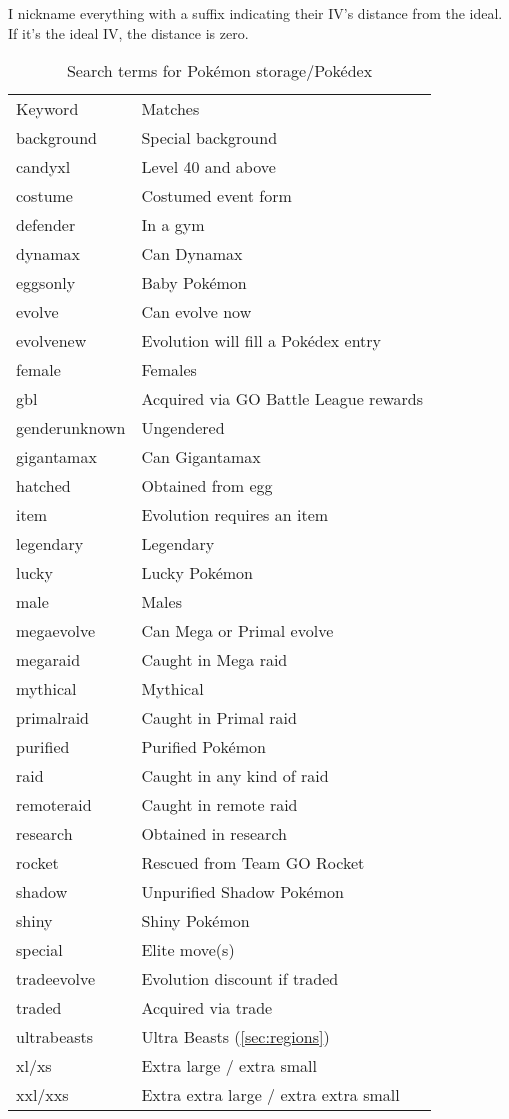 I nickname everything with a suffix indicating their IV's distance from the ideal.
If it's the ideal IV, the distance is zero.
\begin{table}
\centering\small
\begin{tabular}{ll}
Keyword & Matches \\
\Midrule
background & Special background \\
candyxl & Level 40 and above \\
costume & Costumed event form \\
defender & In a gym \\
dynamax & Can Dynamax\\
eggsonly & Baby Pokémon \\
evolve & Can evolve now\\
evolvenew & Evolution will fill a Pokédex entry\\
female & Females \\
gbl & Acquired via GO Battle League rewards\\
genderunknown & Ungendered \\
gigantamax & Can Gigantamax\\
hatched & Obtained from egg \\
item & Evolution requires an item\\
legendary & Legendary \\
lucky & Lucky Pokémon \\
male & Males\\
megaevolve & Can Mega or Primal evolve\\
megaraid & Caught in Mega raid\\
mythical & Mythical\\
primalraid & Caught in Primal raid\\
purified & Purified Pokémon\\
raid & Caught in any kind of raid\\
remoteraid & Caught in remote raid\\
research & Obtained in research\\
rocket & Rescued from Team GO Rocket\\
shadow & Unpurified Shadow Pokémon\\
shiny & Shiny Pokémon\\
special & Elite move(s)\\
tradeevolve & Evolution discount if traded\\
traded & Acquired via trade\\
ultrabeasts & Ultra Beasts (\autoref{sec:regions})\\
xl/xs & Extra large / extra small\\
xxl/xxs & Extra extra large / extra extra small\\
\end{tabular}
  \caption{Search terms for Pokémon storage/Pokédex\label{table:searchterms}}
\end{table}
